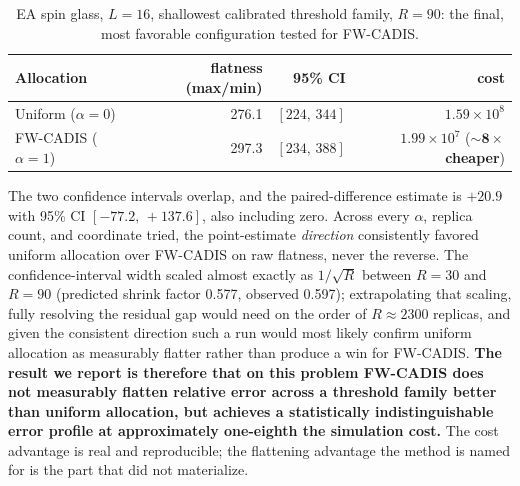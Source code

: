 \documentclass[a4paper,fleqn]{cas-sc}
\begin{document}
	\begin{table}[H]
		\centering\small
		\caption{EA spin glass, $L=16$, shallowest calibrated threshold family, $R=90$: the final,
			most favorable configuration tested for FW-CADIS.}
		\label{tab:fwcadis}
		\begin{tabular}{lrrr}
			\toprule
			Allocation & flatness (max/min) & 95\% CI & cost \\
			\midrule
			Uniform ($\alpha=0$) & 276.1 & $[224,\,344]$ & $1.59\times10^{8}$ \\
			FW-CADIS ($\alpha=1$) & 297.3 & $[234,\,388]$ & $1.99\times10^{7}$ ($\mathbf{\sim\!8\times}$ \textbf{cheaper}) \\
			\bottomrule
		\end{tabular}
	\end{table}
	
	The two confidence intervals overlap, and the paired-difference estimate is $+20.9$ with
	95\% CI $[-77.2,\,+137.6]$, also including zero. Across every $\alpha$, replica count, and
	coordinate tried, the point-estimate \emph{direction} consistently favored uniform
	allocation over FW-CADIS on raw flatness, never the reverse. The confidence-interval width
	scaled almost exactly as $1/\sqrt{R}$ between $R=30$ and $R=90$ (predicted shrink factor
	0.577, observed 0.597); extrapolating that scaling, fully resolving the residual gap would
	need on the order of $R\approx2300$ replicas, and given the consistent direction such a run
	would most likely confirm uniform allocation as measurably flatter rather than produce a win
	for FW-CADIS. \textbf{The result we report is therefore that on this problem FW-CADIS does
		not measurably flatten relative error across a threshold family better than uniform
		allocation, but achieves a statistically indistinguishable error profile at approximately
		one-eighth the simulation cost.} The cost advantage is real and reproducible; the
	flattening advantage the method is named for is the part that did not materialize.
	
\end{document}
